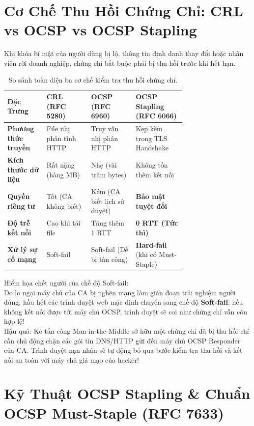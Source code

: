 \section{Cơ Chế Thu Hồi Chứng Chỉ: CRL vs OCSP vs OCSP Stapling}

Khi khóa bí mật của người dùng bị lộ, thông tin định danh thay đổi hoặc nhân viên rời doanh nghiệp, chứng chỉ bắt buộc phải bị thu hồi trước khi hết hạn.

\begin{table}[h]
\centering\small
\begin{tabularx}{\linewidth}{@{}p{0.22\linewidth} p{0.25\linewidth} p{0.25\linewidth} X@{}}
\toprule
\textbf{Đặc Trưng} & \textbf{CRL (RFC 5280)} & \textbf{OCSP (RFC 6960)} & \textbf{OCSP Stapling (RFC 6066)} \\
\midrule
\textbf{Phương thức truyền} & File nhị phân tĩnh HTTP & Truy vấn nhị phân HTTP & Kẹp kèm trong TLS Handshake \\
\textbf{Kích thước dữ liệu} & Rất nặng (hàng MB) & Nhẹ (vài trăm bytes) & Không tốn thêm kết nối \\
\textbf{Quyền riêng tư} & Tốt (CA không biết) & Kém (CA biết lịch sử duyệt) & \textbf{Bảo mật tuyệt đối} \\
\textbf{Độ trễ kết nối} & Cao khi tải file & Tăng thêm 1 RTT & \textbf{0 RTT (Tức thì)} \\
\textbf{Xử lý sự cố mạng} & Soft-fail & Soft-fail (Dễ bị tấn công) & \textbf{Hard-fail} (khi có Must-Staple) \\
\bottomrule
\end{tabularx}
\caption{So sánh toàn diện ba cơ chế kiểm tra thu hồi chứng chỉ.}
\end{table}

\begin{batngo}
Hiểm họa chết người của chế độ Soft-fail:\\
Do lo ngại máy chủ của CA bị nghẽn mạng làm gián đoạn trải nghiệm người dùng, hầu hết các trình duyệt web mặc định chuyển sang chế độ \textbf{Soft-fail}: nếu không kết nối được tới máy chủ OCSP, trình duyệt sẽ coi như chứng chỉ vẫn còn hợp lệ!\\
Hậu quả: Kẻ tấn công Man-in-the-Middle sở hữu một chứng chỉ đã bị thu hồi chỉ cần chủ động chặn các gói tin DNS/HTTP gửi đến máy chủ OCSP Responder của CA. Trình duyệt nạn nhân sẽ tự động bỏ qua bước kiểm tra thu hồi và kết nối an toàn với máy chủ giả mạo của hacker!
\end{batngo}

\section{Kỹ Thuật OCSP Stapling \& Chuẩn OCSP Must-Staple (RFC 7633)}

